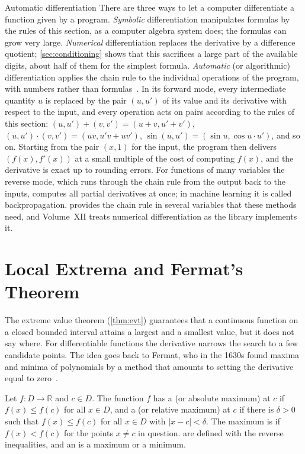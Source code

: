 \begin{note}{Automatic differentiation}
There are three ways to let a computer differentiate a function given by a program. \emph{Symbolic} differentiation manipulates formulas by the rules of this section, as a computer algebra system does; the formulas can grow very large. \emph{Numerical} differentiation replaces the derivative by a difference quotient; \cref{sec:conditioning} shows that this sacrifices a large part of the available digits, about half of them for the simplest formula. \emph{Automatic} (or algorithmic) differentiation applies the chain rule to the individual operations of the program, with numbers rather than formulas~\cite{wengert1964,griewank2008}. In its forward mode, every intermediate quantity $u$ is replaced by the pair $(u,u')$ of its value and its derivative with respect to the input, and every operation acts on pairs according to the rules of this section: $(u,u')+(v,v')=(u+v,u'+v')$, $(u,u')\cdot(v,v')=(uv,u'v+uv')$, $\sin(u,u')=(\sin u,\cos u\cdot u')$, and so on. Starting from the pair $(x,1)$ for the input, the program then delivers $(f(x),f'(x))$ at a small multiple of the cost of computing $f(x)$, and the derivative is exact up to rounding errors. For functions of many variables the reverse mode, which runs through the chain rule from the output back to the inputs, computes all partial derivatives at once; in machine learning it is called backpropagation.  provides the chain rule in several variables that these methods need, and Volume~XII treats numerical differentiation as the library implements it.
\end{note}

\section{Local Extrema and Fermat's Theorem}
\label{sec:extrema}

The extreme value theorem (\cref{thm:evt}) guarantees that a continuous function on a closed bounded interval attains a largest and a smallest value, but it does not say where. For differentiable functions the derivative narrows the search to a few candidate points. The idea goes back to Fermat, who in the 1630s found maxima and minima of polynomials by a method that amounts to setting the derivative equal to zero~\cite{edwards1979}.

\begin{definition}[Extrema]
\label{def:extremum}
Let $f\colon D\to\mathbb R$ and $c\in D$. The function $f$ has a  (or absolute maximum) at $c$ if $f(x)\le f(c)$ for all $x\in D$, and a  (or relative maximum) at $c$ if there is $\delta>0$ such that $f(x)\le f(c)$ for all $x\in D$ with $|x-c|<\delta$. The maximum is  if $f(x)<f(c)$ for the points $x\ne c$ in question.  are defined with the reverse inequalities, and an  is a maximum or a minimum.
\end{definition}


